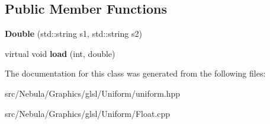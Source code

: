 \subsection*{\-Public \-Member \-Functions}
\begin{DoxyCompactItemize}
\item 
\hypertarget{classNeb_1_1glsl_1_1Uniform_1_1Vector_1_1Double_a4f5b3ffeff4c2d183a7af7401c434731}{{\bfseries \-Double} (std\-::string s1, std\-::string s2)}\label{classNeb_1_1glsl_1_1Uniform_1_1Vector_1_1Double_a4f5b3ffeff4c2d183a7af7401c434731}

\item 
\hypertarget{classNeb_1_1glsl_1_1Uniform_1_1Vector_1_1Double_a7241e6a2f7b3041cbc2beca1f83d504a}{virtual void {\bfseries load} (int, double)}\label{classNeb_1_1glsl_1_1Uniform_1_1Vector_1_1Double_a7241e6a2f7b3041cbc2beca1f83d504a}

\end{DoxyCompactItemize}


\-The documentation for this class was generated from the following files\-:\begin{DoxyCompactItemize}
\item 
src/\-Nebula/\-Graphics/glsl/\-Uniform/uniform.\-hpp\item 
src/\-Nebula/\-Graphics/glsl/\-Uniform/\-Float.\-cpp\end{DoxyCompactItemize}

